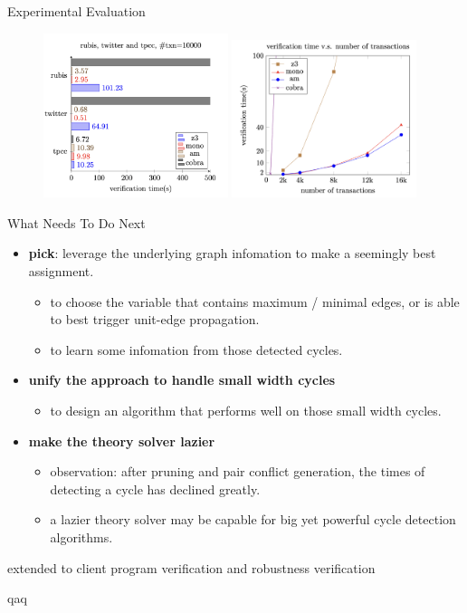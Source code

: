 \begin{frame}{Experimental Evaluation}
	\begin{figure}[H]
		\centering
		\includegraphics[width=0.48\textwidth]{figs/ser-checker-rubis-twitter-and-tpcc-ntxn10000.png}
		\includegraphics[width=0.48\textwidth]{figs/ser-checker-chengRW-verification-time-vs-ntxns.png}
	\end{figure}
\end{frame}

\begin{frame}{What Needs To Do Next}
	\begin{itemize}
		\item \textbf{pick}: leverage the underlying graph infomation to make a seemingly best assignment.
		\begin{itemize}
			\item to choose the variable that contains maximum / minimal edges, or is able to best trigger unit-edge propagation. 
			\item to learn some infomation from those detected cycles.
		\end{itemize}
		\item \textbf{unify the approach to handle small width cycles}
		\begin{itemize}
			\item to design an algorithm that performs well on those small width cycles.
		\end{itemize}
		\item \textbf{make the theory solver lazier}
		\begin{itemize}
			\item observation: after pruning and pair conflict generation, the times of detecting a cycle has declined greatly.
			\item a lazier theory solver may be capable for big yet powerful cycle detection algorithms.  
		\end{itemize}
	\end{itemize}
\end{frame}

\begin{frame}
	extended to client program verification and robustness verification

	qaq
\end{frame}
